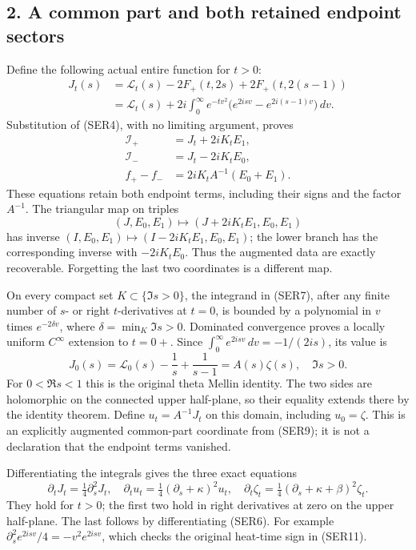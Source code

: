 \documentclass[
  10pt,
  a4paper,
]{article}
\begin{document}
\subsection{2. A common part and both retained endpoint
sectors}\label{a-common-part-and-both-retained-endpoint-sectors}

Define the following actual entire function for \(t>0\): \[
\begin{aligned}
J_t(s)
 &=\mathcal L_t(s)-2F_+(t,2s)+2F_+(t,2(s-1))\\
 &=\mathcal L_t(s)+2i\int_0^\infty e^{-tv^2}
       \big(e^{2isv}-e^{2i(s-1)v}\big)\,dv.
\end{aligned}\tag{SER7}
\] Substitution of (SER4), with no limiting argument, proves \[
\begin{aligned}
\mathcal I_+&=J_t+2iK_t E_1,\\
\mathcal I_-&=J_t-2iK_t E_0,\\
f_+-f_-&=2iK_t A^{-1}(E_0+E_1).
\end{aligned}\tag{SER8}
\] These equations retain both endpoint terms, including their signs and
the factor \(A^{-1}\). The triangular map on triples \[
(J,E_0,E_1)\longmapsto(J+2iK_t E_1,E_0,E_1)
\tag{SER9}
\] has inverse \((I,E_0,E_1)\mapsto(I-2iK_t E_1,E_0,E_1)\); the lower
branch has the corresponding inverse with \(-2iK_t E_0\). Thus the
augmented data are exactly recoverable. Forgetting the last two
coordinates is a different map.

On every compact set \(K\subset\{\Im s>0\}\), the integrand in (SER7),
after any finite number of \(s\)- or right \(t\)-derivatives at \(t=0\),
is bounded by a polynomial in \(v\) times \(e^{-2\delta v}\), where
\(\delta=\min_K\Im s>0\). Dominated convergence proves a locally uniform
\(C^\infty\) extension to \(t=0+\). Since
\(\int_0^\infty e^{2isv}\,dv=-1/(2is)\), its value is \[
J_0(s)=\mathcal L_0(s)-\frac1s+\frac1{s-1}=A(s)\zeta(s),
\quad \Im s>0.
\tag{SER10}
\] For \(0<\Re s<1\) this is the original theta Mellin identity. The two
sides are holomorphic on the connected upper half-plane, so their
equality extends there by the identity theorem. Define \(u_t=A^{-1}J_t\)
on this domain, including \(u_0=\zeta\). This is an explicitly augmented
common-part coordinate from (SER9); it is not a declaration that the
endpoint terms vanished.

Differentiating the integrals gives the three exact equations \[
\partial_t J_t=\tfrac14\partial_s^2J_t,
\quad
\partial_t u_t=\tfrac14(\partial_s+\kappa)^2u_t,
\quad
\partial_t\zeta_t=\tfrac14(\partial_s+\kappa+\beta)^2\zeta_t.
\tag{SER11}
\] They hold for \(t>0\); the first two hold in right derivatives at
zero on the upper half-plane. The last follows by differentiating
(SER6). For example \(\partial_s^2 e^{2isv}/4=-v^2e^{2isv}\), which
checks the original heat-time sign in (SER11).
\end{document}
